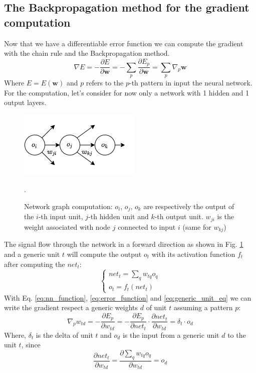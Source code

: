 \subsection{The Backpropagation method for the gradient computation}
Now that we have a differentiable error function we can compute the gradient with the chain rule and the Backpropagation method.
$$\nabla E = - \frac{\partial E}{\partial \mathbf{w}} = - \sum_{p} \frac{\partial E_p}{\partial \mathbf{w}} = \sum_{p} \nabla_{p}\mathbf{w}$$
Where $ E = E(\mathbf{w})$ and $p$ refers to the $p$-th pattern in input the neural network. For the computation, let's consider for now only a network with 1 hidden and 1 output layers. 
\begin{figure}[H]
    \centering
    \includegraphics[scale = 0.6]{Images/flow_g.png}
    \caption{Network graph computation: $o_i$, $o_j$, $o_k$ are respectively the output of the  $i$-th input unit, $j$-th hidden unit and  $k$-th output unit. $w_{ji}$ is the weight associated with node $j$ connected to input $i$ (same for $w_{kj}$)}.
    \label{fig:computation_graph_backProp}
\end{figure}
\noindent The signal flow through the network in a forward direction as shown in Fig. \ref{fig:computation_graph_backProp} and a generic unit $t$ will compute the output $o_t$ with its activation function $f_t$ after computing the $net_t$:
\begin{equation}
\label{eq:generic_unit_eq}
    \left\{
        \begin{array}{ll}
            net_t = \sum_{q} w_{tq}o_q\\
            o_t = f_t(net_t)
        \end{array}
    \right.
\end{equation}
With Eq. \ref{eq:nn_function}, \ref{eq:error_function} and \ref{eq:generic_unit_eq} we can write the gradient respect a generic weights $d$ of unit $t$ assuming a pattern $p$:
$$\nabla_{p} w_{td} = - \frac{\partial E_{p}}{\partial w_{td}} = - \frac{\partial E_{p}}{\partial net_t} \cdot \frac{\partial net_t}{\partial w_{td}} = \delta_{t} \cdot o_d$$
Where, $\delta_t$ is the delta of unit $t$ and $o_d$ is the  input from a generic unit $d$ to the unit $t$, since
\[
 \frac{\partial net_t}{\partial w_{td}} = \frac{\partial \sum_{q} w_{tq}o_q}{\partial w_{td}} = o_d
\]

